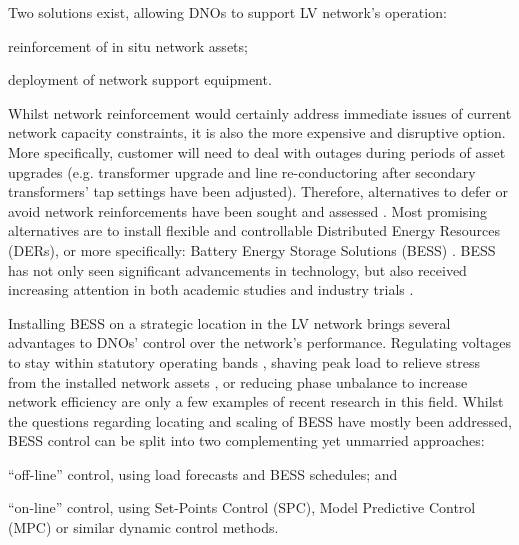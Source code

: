 Two solutions exist, allowing DNOs to support LV network's operation: 
\begin{enumerate*}
	\item reinforcement of in situ network assets;
	\item deployment of network support equipment.
\end{enumerate*}
Whilst network reinforcement would certainly address immediate issues of current network capacity constraints, it is also the more expensive and disruptive option.
More specifically, customer will need to deal with outages during periods of asset upgrades (e.g. transformer upgrade and line re-conductoring after secondary transformers' tap settings have been adjusted).
Therefore, alternatives to defer or avoid network reinforcements have been sought and assessed \cite{Harrison2007, Zangs2016a, VanderKlauw2016d, Greenwood2017}.
Most promising alternatives are to install flexible and controllable Distributed Energy Resources (DERs), or more specifically: Battery Energy Storage Solutions (BESS) \cite{Wade2010}.
BESS has not only seen significant advancements in technology, but also received increasing attention in both academic studies and industry trials \cite{Palizban2016}.


Installing BESS on a strategic location in the LV network brings several advantages to DNOs' control over the network's performance.
Regulating voltages to stay within statutory operating bands \cite{Yang2014}, shaving peak load to relieve stress from the installed network assets \cite{Bennett2015}, or reducing phase unbalance to increase network efficiency \cite{Wang2015b} are only a few examples of recent research in this field.
Whilst the questions regarding locating and scaling of BESS have mostly been addressed, BESS control can be split into two complementing yet unmarried approaches:
\begin{enumerate*}
	\item ``off-line'' control, using load forecasts and BESS schedules; and
	\item ``on-line'' control, using Set-Points Control (SPC), Model Predictive Control (MPC) or similar dynamic control methods.
\end{enumerate*}

